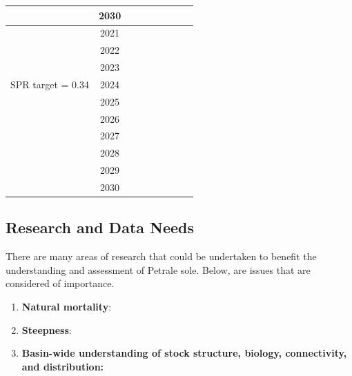\documentclass[12pt,]{article}
\begin{document}
\begin{table}[ht]
{\begin{tabular}{l|cc|>{\centering}p{.7in}c|>{\centering}p{.7in}c|>{\centering}p{.7in}c}
   & 2030 &  &  &  &  &  &  &  \\ 
   \hline
 & 2021 &  &  &  &  &  &  &  \\ 
   & 2022 &  &  &  &  &  &  &  \\ 
   & 2023 &  &  &  &  &  &  &  \\ 
  SPR target = 0.34 & 2024 &  &  &  &  &  &  &  \\ 
   & 2025 &  &  &  &  &  &  &  \\ 
   & 2026 &  &  &  &  &  &  &  \\ 
   & 2027 &  &  &  &  &  &  &  \\ 
   & 2028 &  &  &  &  &  &  &  \\ 
   & 2029 &  &  &  &  &  &  &  \\ 
   & 2030 &  &  &  &  &  &  &  \\ 
   \hline
\end{tabular}
}
\end{table}

\FloatBarrier

\subsection*{Research and Data Needs}\label{research-and-data-needs}

There are many areas of research that could be undertaken to benefit the
understanding and assessment of Petrale sole. Below, are issues that are
considered of importance.

\begin{enumerate}

\item \textbf{Natural mortality}: 

\item \textbf{Steepness}: 

\item \textbf{Basin-wide understanding of stock structure, biology, connectivity, and distribution:} 

\end{enumerate}
\end{document}
